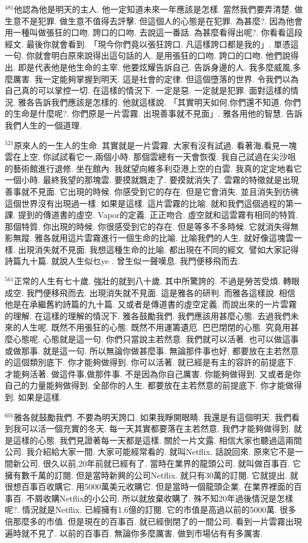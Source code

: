 \documentclass{book}
\begin{document}
$^{481}$他認為他是明天的主人.
他一定知道未來一年應該是怎樣.
當然我們要弄清楚.
做生意不是犯罪.
做生意不值得去評擊.
但這個人的心態是在犯罪.
為甚麼?.
因為他會用一種叫做張狂的口吻.
誇口的口吻.
去說這一番話.
為甚麼看得出呢?.
你看看這段經文.
最後你就會看到.
「現今你們竟以張狂誇口.
凡這樣誇口都是我的」.
單憑這一句.
你就會明白原來說得出這句話的人.
是用張狂的口吻.
誇口的口吻.
他們說得出.
即是代表他是他生命的主宰.
他要炫耀告訴自己.
告訴身邊的人.
我多麼威風,多麼厲害.
我一定能夠掌握到明天.
這是社會的定律.
但這個墮落的世界.
令我們以為自己真的可以掌控一切.
在這樣的情況下.
一定是惡.
一定就是犯罪.
面對這樣的情況.
雅各告訴我們應該是怎樣的.
他就這樣說.
「其實明天如何,你們還不知道.
你們的生命是什麼呢?.
你們原是一片雲霧.
出現善事就不見面」.
雅各用他的智慧.
告訴我們人生的一個道理.

$^{521}$原來人的一生人的生命.
其實就是一片雲霧.
大家有沒有試過.
看著海,看見一塊雲在上空.
你試試看它一,兩個小時.
那個雲總有一天會恢復.
我自己試過在尖沙咀的藝術館進行退修.
坐在館內.
我就望向維多利亞港上空的白雲.
我真的定定地看它一個小時.
最終我望的那塊雲.
要摸就飄走了.
要摸就消失了.
雲霧的特徵就是出現善事就不見面.
它出現的時候.
你感受到它的存在.
但是它會消失.
並且消失到彷彿這個世界沒有出現過一樣.
如果是這樣.
這片雲霧的比喻.
就和我們這個過程的第一課.
提到的傳道書的虛空.
Vapor的定義.
正正吻合.
虛空就和這雲霧有相同的特質.
那個特質.
你出現的時候.
你很感受到它的存在.
但是等多不多時候.
它就消失得無影無蹤.
雅各就用這片雲霧進行一個生命的比喻.
比喻我們的人生.
就好像這塊雲一樣.
出現消失就不見面.
我想這種生命的比喻.
都出現在不同的經文.
譬如大家記得詩篇九十篇.
就說人生似乜ye .
曾生似一聲嘆息.
我門便移飛而去.

$^{561}$正常的人生有七十歲.
強壯的就到八十歲.
其中所驚誇的.
不過是勞苦受煩.
轉眼成空.
我門便移飛而去.
出現消失就不見面.
這是雅各的研判.
而雅各這樣說.
相信他是在承繼舊約詩篇的九十篇.
又或者是傳道書的虛空定義.
而說出來的一片雲霧的理解.
在這樣的理解的情況下.
雅各鼓勵我們.
我們應該用甚麼心態.
去過我們未來的人生呢.
既然不用張狂的心態.
既然不用運籌遺厄.
巴巴閉閉的心態.
究竟用甚麼心態呢.
心態就是這一句.
你們只當說主若然意.
我們就可以活著.
也可以做這事或做那事.
就是這一句.
所以無論你做甚麼事.
無論那件事也好.
都要放在主若然意的這個類別底下.
你才能夠做得到.
你可以活著.
就已經是有主的容許的前提底下.
才能夠活著.
做這件事,做那件事.
不是因為你自己厲害.
你能夠做得到.
又或者是你自己的力量能夠做得到.
全部你的人生.
都要放在主若然意的前提底下.
你才能做得到.
如果是這樣.

$^{601}$雅各就鼓勵我們.
不要為明天誇口.
如果我睜開眼睛.
我還是有這個明天.
我們看到我可以活一個充實的冬天.
每一天其實都要落在主若然意.
我們才能夠做得到.
就是這樣的心態.
我們見證著每一天都是這樣.
關於一片文露.
相信大家也聽過這兩間公司.
我介紹給大家一間.
大家可能經常看的.
就叫Netflix.
話說回來.
原來它不是一間新公司.
很久以前,20年前就已經有了.
當時在業界的龍頭公司.
就叫做百事百.
它擁有數千萬的訂閱.
但是當時新興的公司Netflix.
就只有30萬的訂閱.
它就提出.
就很想百事百收購它.
用5000萬美元收購它.
但是當時一個龍頭企業.
在業界裡面的百事百.
不屑收購Netflix的小公司.
所以就放棄收購了.
殊不知20年過後情況是怎樣呢?.
情況就是Netflix.
已經擁有1.6億的訂閱.
它的市值是高過以前的5000萬.
很多倍那麼多的市值.
但是現在的百事百.
就已經倒閉了的一間公司.
看到一片雲霧出現遍時就不見了.
以前的百事百.
無論你多麼厲害.
做到市場佔有有多厲害.
\end{document}
